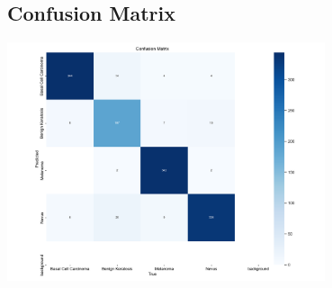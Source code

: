 \documentclass[a4paper,12pt]{report}
\begin{document}
\begin{spacing}{1.5}
    \subsection*{Confusion Matrix}
    \begin{center}
        \includegraphics[width=0.7\textwidth]{Pics/confusion_matrix.png}
    \end{center}


\end{spacing}
\end{document}
